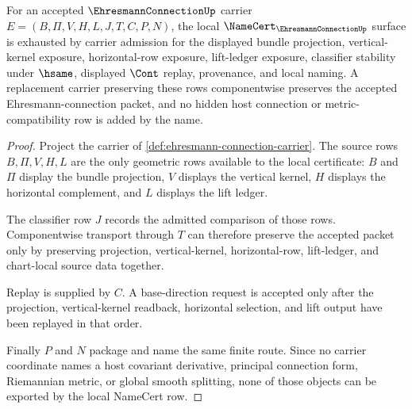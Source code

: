 \begin{theorem}
\label{thm:ehresmann-connection-namecert-obligation}
For an accepted $\EhresmannConnectionUp$ carrier $E=(B,\Pi,V,H,L,J,T,C,P,N)$, the local $\NameCert_{\EhresmannConnectionUp}$ surface is exhausted by carrier admission for the displayed bundle projection, vertical-kernel exposure, horizontal-row exposure, lift-ledger exposure, classifier stability under $\hsame$, displayed $\Cont$ replay, provenance, and local naming. A replacement carrier preserving these rows componentwise preserves the accepted Ehresmann-connection packet, and no hidden host connection or metric-compatibility row is added by the name.
\end{theorem}
\begin{proof}
Project the carrier of \autoref{def:ehresmann-connection-carrier}. The source rows $B,\Pi,V,H,L$ are the only geometric rows available to the local certificate: $B$ and $\Pi$ display the bundle projection, $V$ displays the vertical kernel, $H$ displays the horizontal complement, and $L$ displays the lift ledger.

The classifier row $J$ records the admitted comparison of those rows. Componentwise transport through $T$ can therefore preserve the accepted packet only by preserving projection, vertical-kernel, horizontal-row, lift-ledger, and chart-local source data together.

Replay is supplied by $C$. A base-direction request is accepted only after the projection, vertical-kernel readback, horizontal selection, and lift output have been replayed in that order.

Finally $P$ and $N$ package and name the same finite route. Since no carrier coordinate names a host covariant derivative, principal connection form, Riemannian metric, or global smooth splitting, none of those objects can be exported by the local NameCert row.
\end{proof}


